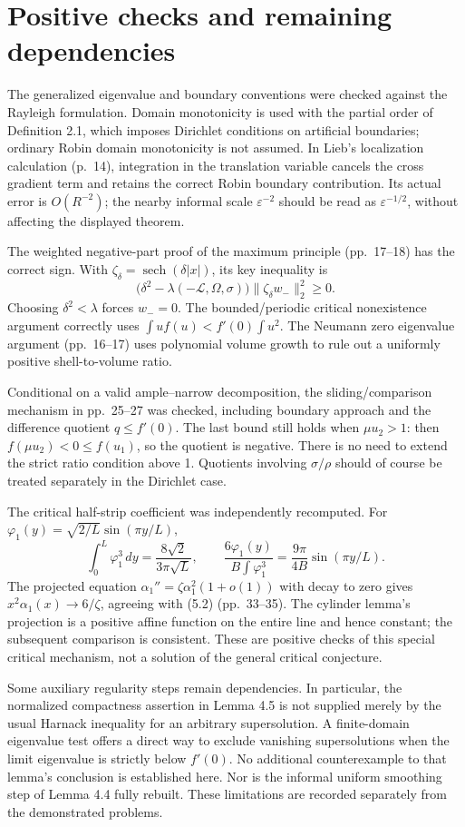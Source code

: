 \documentclass[10pt]{article}
\begin{document}
\section*{Positive checks and remaining dependencies}
The generalized eigenvalue and boundary conventions were checked against the Rayleigh formulation. Domain monotonicity is used with the partial order of Definition 2.1, which imposes Dirichlet conditions on artificial boundaries; ordinary Robin domain monotonicity is not assumed. In Lieb’s localization calculation (p. 14), integration in the translation variable cancels the cross gradient term and retains the correct Robin boundary contribution. Its actual error is \(O(R^{-2})\); the nearby informal scale \(\varepsilon^{-2}\) should be read as \(\varepsilon^{-1/2}\), without affecting the displayed theorem.\par
The weighted negative-part proof of the maximum principle (pp. 17–18) has the correct sign. With \(\zeta_\delta=\operatorname{sech}(\delta|x|)\), its key inequality is \[\bigl(\delta^2-\lambda(-\mathcal L,\Omega,\sigma)\bigr)
       \|\zeta_\delta w_-\|_2^2\ge0.\] Choosing \(\delta^2<\lambda\) forces \(w_-=0\). The bounded/periodic critical nonexistence argument correctly uses \(\int u f(u)<f'(0)\int u^2\). The Neumann zero eigenvalue argument (pp. 16–17) uses polynomial volume growth to rule out a uniformly positive shell-to-volume ratio.\par
Conditional on a valid ample–narrow decomposition, the sliding/comparison mechanism in pp. 25–27 was checked, including boundary approach and the difference quotient \(q\le f'(0)\). The last bound still holds when \(\mu u_2>1\): then \(f(\mu u_2)<0\le f(u_1)\), so the quotient is negative. There is no need to extend the strict ratio condition above 1. Quotients involving \(\sigma/\rho\) should of course be treated separately in the Dirichlet case.\par
The critical half-strip coefficient was independently recomputed. For \(\varphi_1(y)=\sqrt{2/L}\sin(\pi y/L)\), \[\int_0^L\varphi_1^3\,dy=\frac{8\sqrt2}{3\pi\sqrt L},\qquad
 \frac{6\varphi_1(y)}{B\int\varphi_1^3}
 =\frac{9\pi}{4B}\sin(\pi y/L).\] The projected equation \(\alpha_1''=\zeta\alpha_1^2(1+o(1))\) with decay to zero gives \(x^2\alpha_1(x)\to6/\zeta\), agreeing with (5.2) (pp. 33–35). The cylinder lemma’s projection is a positive affine function on the entire line and hence constant; the subsequent comparison is consistent. These are positive checks of this special critical mechanism, not a solution of the general critical conjecture.\par
Some auxiliary regularity steps remain dependencies. In particular, the normalized compactness assertion in Lemma 4.5 is not supplied merely by the usual Harnack inequality for an arbitrary supersolution. A finite-domain eigenvalue test offers a direct way to exclude vanishing supersolutions when the limit eigenvalue is strictly below \(f'(0)\). No additional counterexample to that lemma’s conclusion is established here. Nor is the informal uniform smoothing step of Lemma 4.4 fully rebuilt. These limitations are recorded separately from the demonstrated problems.\par
\end{document}
